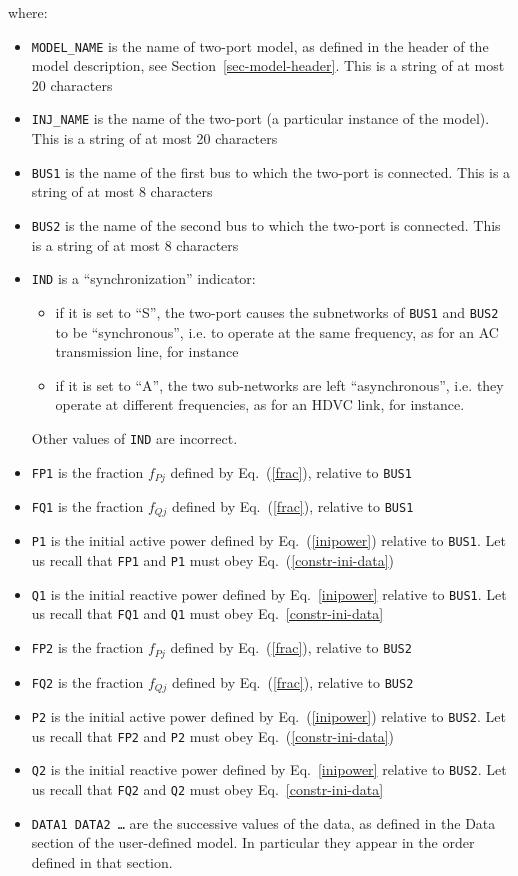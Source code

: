 where:
\begin{itemize}
\item{\tt MODEL\_NAME} is the name of two-port model, as defined in the header of the model description, see Section~\ref{sec-model-header}. This is a string of at most 20 characters
\item{\tt INJ\_NAME} is the name of the two-port (a particular instance of the model). This is a string of at most 20 characters
\item{\tt BUS1} is the name of the first bus to which the two-port is connected. This is a string of at most 8 characters
\item{\tt BUS2} is the name of the second bus to which the two-port is connected. This is a string of at most 8 characters
\item{\tt IND} is a ``synchronization'' indicator:
\begin{itemize}
\item if it is set to ``S'', the two-port causes the subnetworks of {\tt BUS1} and {\tt BUS2} to be ``synchronous'', i.e. to operate at the same frequency, as for an AC transmission line, for instance
\item if it is set to ``A'', the two sub-networks are left ``asynchronous'', i.e. they operate at different frequencies, as for an HDVC link, for instance.
\end{itemize}
Other values of {\tt IND} are incorrect.
\item{\tt FP1} is the fraction $f_{Pj}$ defined by Eq.~(\ref{frac}), relative to {\tt BUS1}
\item{\tt FQ1} is the fraction $f_{Qj}$ defined by Eq.~(\ref{frac}), relative to {\tt BUS1} 
\item{\tt P1} is the initial active power defined by Eq.~(\ref{inipower}) relative to {\tt BUS1}. Let us recall that {\tt FP1} and {\tt P1} must obey Eq.~(\ref{constr-ini-data})
\item{\tt Q1} is the initial reactive power defined by Eq.~\ref{inipower} relative to {\tt BUS1}. Let us recall that {\tt FQ1} and {\tt Q1} must obey Eq.~\ref{constr-ini-data}
\item{\tt FP2} is the fraction $f_{Pj}$ defined by Eq.~(\ref{frac}), relative to {\tt BUS2}
\item{\tt FQ2} is the fraction $f_{Qj}$ defined by Eq.~(\ref{frac}), relative to {\tt BUS2} 
\item{\tt P2} is the initial active power defined by Eq.~(\ref{inipower}) relative to {\tt BUS2}. Let us recall that {\tt FP2} and {\tt P2} must obey Eq.~(\ref{constr-ini-data})
\item{\tt Q2} is the initial reactive power defined by Eq.~\ref{inipower} relative to {\tt BUS2}. Let us recall that {\tt FQ2} and {\tt Q2} must obey Eq.~\ref{constr-ini-data}
\item{\tt DATA1 DATA2 \ldots} are the successive values of the data, as defined in the Data section of the user-defined model. In particular they appear in the order defined in that section.
\end{itemize}